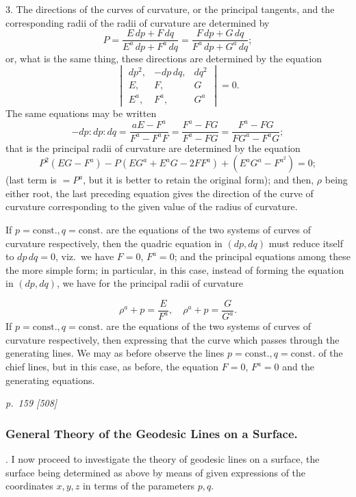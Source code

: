 \documentclass[11pt,a4paper]{book}
\begin{document}
3. The directions of the curves of curvature, or the principal tangents, and the
corresponding radii of the radii of curvature are determined by
\[
P = \frac{E\,dp + F\,dq}{E^a\,dp + F^a\,dq} = \frac{F\,dp + G\,dq}{F^a\,dp + G^a\,dq};
\]
or, what is the same thing, these directions are determined by the equation
\[
\begin{vmatrix}
dp^2, & -dp\,dq, & dq^2\\
E, & F, & G\\
E^a, & F^a, & G^a
\end{vmatrix} = 0.
\]
The same equations may be written
\[
-dp : dp : dq = \frac{aE - F^a}{F^a - F^a F} = \frac{F^a - F G}{F^a - F G} = \frac{F^a - F G}{F G^a - F^a G};
\]
that is the principal radii of curvature are determined by the equation
\[
P^2(E G - F^a) - P(EG^a + E^a G - 2FF^a) + (E^a G^a - F^{a^2}) = 0;
\]
(last term is $= P^a$, but it is better to retain the original form); and then, $\rho$ being
either root, the last preceding equation gives the direction of the curve of curvature
corresponding to the given value of the radius of curvature.

If $p = \mathrm{const.}, q = \mathrm{const.}$ are the equations of the two systems of curves of curvature
respectively, then the quadric equation in $(dp, dq)$ must reduce itself to $dp\,dq = 0$,
viz.\ we have $F = 0$, $F^a = 0$; and the principal equations among these the more simple form;
in particular, in this case, instead of forming the equation in $(dp, dq)$, we have for the
principal radii of curvature

\[
\rho^a + p = \frac{E}{F^a},\quad \rho^a + p = \frac{G}{G^a}.
\]
If $p = \mathrm{const.}, q = \mathrm{const.}$ are the equations of the two systems of curves of
curvature respectively, then expressing that the curve which passes through the
generating lines. We may as before observe the lines $p = \mathrm{const.}, q = \mathrm{const.}$ of the
chief lines, but in this case, as before, the equation $F = 0$, $F^a = 0$ and the
generating equations.

\clearpage

\bigskip
\textit{p.~159 [508]}
\smallskip

\subsubsection*{General Theory of the Geodesic Lines on a Surface.}

. I now proceed to investigate the theory of geodesic lines on a surface, the
surface being determined as above by means of given expressions of the coordinates
$x, y, z$ in terms of the parameters $p, q$.
\end{document}
